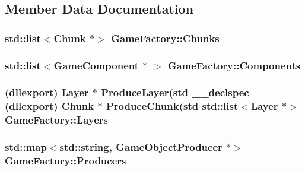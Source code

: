 \subsection{Member Data Documentation}
\hypertarget{class_game_factory_a77496a7ea1e2fa54acb18c499b3bd3bb}{
\subsubsection[{Chunks}]{\setlength{\rightskip}{0pt plus 5cm}std\-::list$<${\bf Chunk} $\ast$$>$ Game\-Factory\-::\-Chunks\hspace{0.3cm}{\ttfamily [private]}}}\label{class_game_factory_a77496a7ea1e2fa54acb18c499b3bd3bb}
\hypertarget{class_game_factory_a90fc6360610babaf3d2d880f782772b3}{
\subsubsection[{Components}]{\setlength{\rightskip}{0pt plus 5cm}std\-::list$<${\bf Game\-Component} $\ast$ $>$ Game\-Factory\-::\-Components\hspace{0.3cm}{\ttfamily [private]}}}\label{class_game_factory_a90fc6360610babaf3d2d880f782772b3}
\hypertarget{class_game_factory_abe6bbfe34d73050414a71f1f454d2884}{
\subsubsection[{Layers}]{ (dllexport) {\bf Layer} $\ast$ Produce\-Layer(std {\bf \-\_\-\-\_\-declspec} (dllexport) {\bf Chunk} $\ast$ Produce\-Chunk(std std\-::list$<${\bf Layer} $\ast$$>$ Game\-Factory\-::\-Layers\hspace{0.3cm}{\ttfamily [private]}}}\label{class_game_factory_abe6bbfe34d73050414a71f1f454d2884}
\hypertarget{class_game_factory_ad00e99627ab0f6ac0dbc04c7479084bd}{
\subsubsection[{Producers}]{\setlength{\rightskip}{0pt plus 5cm}std\-::map$<$std\-::string, {\bf Game\-Object\-Producer} $\ast$$>$ Game\-Factory\-::\-Producers\hspace{0.3cm}{\ttfamily [private]}}}\label{class_game_factory_ad00e99627ab0f6ac0dbc04c7479084bd}
